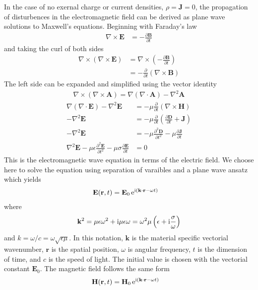 In the case of no exernal charge or current densities, $\rho=\mathbf{J}=0$,
the propagation of disturbences in the electromagnetic field can be derived
as plane wave solutions to Maxwell's equations.  Beginning with Faraday's law
\begin{align}
\nabla \times \mathbf{E} &= -\frac{\partial \mathbf{B}} {\partial t}
\end{align}
and taking the curl of both sides
\begin{align}
\nabla \times
\left(\nabla\times\mathbf{E}\right)&=\nabla\times\left(-\frac{\partial\mathbf{B}}{\partial
t}\right)\\
&=-\frac{\partial}{\partial t}\left(\nabla \times \mathbf{B}\right)
\end{align}
The left side can be expanded and simplified using the vector identity
\begin{align}
\nabla \times \left( \nabla \times \mathbf{A} \right) = \nabla \left(
\nabla \cdot \mathbf{A} \right) - \nabla^2 \mathbf{A}
\end{align}
\begin{align}
\nabla\left(\nabla\cdot\mathbf{E}\right)-\nabla^2\mathbf{E}
&=-\mu\frac{\partial}{\partial t}\left(\nabla \times \mathbf{H}\right)\\
-\nabla^2\mathbf{E}&=-\mu\frac{\partial}{\partial t}\left( \frac{\partial \mathbf{D}}{\partial t} + \mathbf{J}\right) \\
-\nabla^2\mathbf{E}&=-\mu\frac{\partial^2 \mathbf{D}}{\partial t^2} -\mu\frac{\partial\mathbf{J}}{\partial t} \\
\nabla^2\mathbf{E} -\mu\epsilon\frac{\partial^2 \mathbf{E}}{\partial t^2} -\mu\sigma\frac{\partial\mathbf{E}}{\partial t}  &= \mathrm{0} 
\label{eqn:ewe}
\end{align}
This is the electromagnetic wave equation in terms of the electric field.
We choose here to solve the equation using separation of varaibles and a plane wave
ansatz which yields
\begin{align}
 \mathbf{E} ( \mathbf{r}, t ) &= \mathbf{E}_0\, {\mathrm{e}}^{{\mathrm{i}} (\mathbf{k}
 \cdot \mathbf{r} - \omega t )}
\label{eqn:planewaves}
\end{align}
where
\begin{equation}
 \mathbf{k}^2 = \mu \epsilon \omega^2 + {\mathrm{i}} \mu \epsilon \omega = \omega^2 \mu \left(\epsilon + {\mathrm{i}} \frac{\sigma}{\omega}\right)
 \label{eqn:planewavedispersion}
\end{equation}
and $k=\omega/c=\omega\sqrt{\epsilon\mu}$.  In this notation,
$\mathbf{k}$ is the material specific vectorial wavenumber, $\mathbf{r}$ is the
spatial position, $\omega$ is angular frequency, $t$ is
the dimension of time, and $c$ is the speed of light.
The initial value is chosen with the vectorial constant $\mathbf{E}_0$.
The magnetic field follows the same form
\begin{align}
 \mathbf{H} ( \mathbf{r}, t ) &= \mathbf{H}_0\, {\mathrm{e}}^{{\mathrm{i}} (\mathbf{k}
 \cdot \mathbf{r} - \omega t )}
\end{align}
